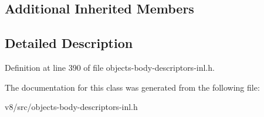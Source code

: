 \subsection*{Additional Inherited Members}


\subsection{Detailed Description}


Definition at line 390 of file objects-\/body-\/descriptors-\/inl.\+h.



The documentation for this class was generated from the following file\+:\begin{DoxyCompactItemize}
\item 
v8/src/objects-\/body-\/descriptors-\/inl.\+h\end{DoxyCompactItemize}
